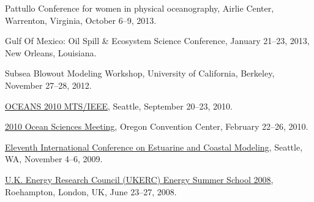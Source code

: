 \documentclass[10pt,letterpaper]{article}
\renewenvironment{itemize}{
  \begin{list}{}{
    \setlength{\leftmargin}{1.5em}
    \setlength{\itemsep}{0.25em}
    \setlength{\parskip}{0pt}
    \setlength{\parsep}{0.25em}
  }
}{
  \end{list}
}
\begin{document}
\begin{itemize}

\item Pattullo Conference for women in physical oceanography, Airlie Center, Warrenton, Virginia, October 6--9, 2013.




\item Gulf Of Mexico: Oil Spill \& Ecosystem Science Conference, January 21--23, 2013, New Orleans, Louisiana.

\item Subsea Blowout Modeling Workshop, University of California, Berkeley, November 27--28, 2012.



\item \href{http://www.oceans10mtsieeeseattle.org/}{OCEANS 2010 MTS/IEEE},
  Seattle,
  September 20--23, 2010.


\item \href{http://www.agu.org/meetings/os10/}{2010 Ocean Sciences Meeting},
  Oregon Convention Center,
  February 22--26, 2010.

\item \href{http://www.oce.uri.edu/ecm11/index.html}{Eleventh International Conference on Estuarine and Coastal Modeling},
  Seattle, WA,
  November 4--6, 2009.


\item \href{http://www.ukerc.ac.uk/support/tiki-index.php?page=0608UKERCSummerSchool}{U.K. Energy Research Council (UKERC) Energy Summer School 2008},
  Roehampton, London, UK,
  June 23--27, 2008.

\end{itemize}
\end{document}
